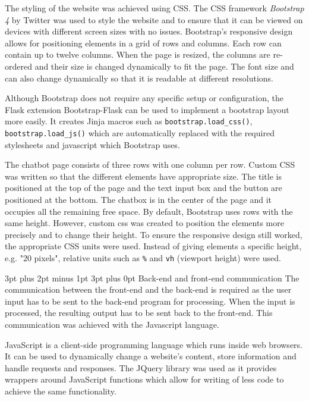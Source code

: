 \documentclass[12pt,a4paper]{article}
\makeatletter
\renewcommand\subsection{\@startsection {subsection}{1}{2mm} %
                                        {3pt plus 2pt minus 1pt} %
                                        {3pt plus 0pt} %
                                        {\normalfont\bfseries}}
\makeatother
\begin{document}
The styling of the website was achieved using CSS. The CSS framework \textit{Bootstrap 4} by Twitter was used to style the website and to ensure that it can be viewed on devices with different screen sizes with no issues. Bootstrap's responsive design allows for positioning elements in a grid of rows and columns. Each row can contain up to twelve columns. When the page is resized, the columns are re-ordered and their size is changed dynamically to fit the page. The font size and can also change dynamically so that it is readable at different resolutions. 

Although Bootstrap does not require any specific setup or configuration, the Flask extension Bootstrap-Flask can be used to implement a bootstrap layout more easily. It creates Jinja macros such as \texttt{bootstrap.load\_css()}, \texttt{bootstrap.load\_js()} which are automatically replaced with the required stylesheets and javascript which Bootstrap uses.

The chatbot page consists of three rows with one column per row. Custom CSS was written so that the different elements have appropriate size. The title is positioned at the top of the page and the text input box and the button are positioned at the bottom. The chatbox is in the center of the page and it occupies all the remaining free space. By default, Bootstrap uses rows with the same height. However, custom css was created to position the elements more precisely and to change their height. To ensure the responsive design still worked, the appropriate CSS units were used. Instead of giving elements a specific height, e.g. "20 pixels", relative units such as \texttt{\%} and \texttt{vh} (viewport height) were used.

\subsection{Back-end and front-end communication}
The communication between the front-end and the back-end is required as the user input has to be sent to the back-end program for processing. When the input is processed, the resulting output has to be sent back to the front-end. This communication was achieved with the Javascript language. 

JavaScript is a client-side programming language which runs inside web browsers. It can be used to dynamically change a website's content, store information and handle requests and responses. The JQuery library was used as it provides wrappers around JavaScript functions which allow for writing of less code to achieve the same functionality.
\end{document}
